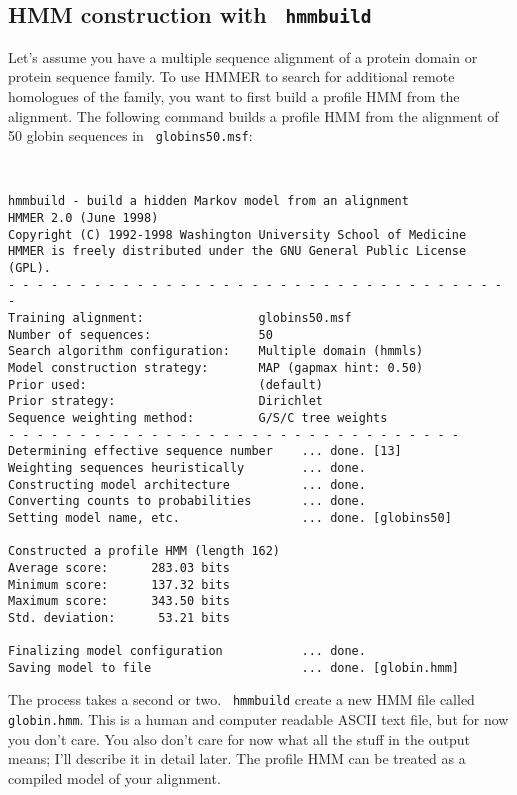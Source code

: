 \documentclass[11pt]{report}
\newcommand{\prog}[1]{\texttt{#1}}
\newcommand{\user}[1]{\noindent{\small\bfseries\texttt{$>$ #1}}\\}
\begin{document}
\subsection{HMM construction with \prog{ hmmbuild}}

Let's assume you have a multiple sequence alignment of a protein
domain or protein sequence family. To use HMMER to search for
additional remote homologues of the family, you want to first build a
profile HMM from the alignment. The following command builds a profile
HMM from the alignment of 50 globin sequences in \prog{ globins50.msf}:

\vspace{1.5em}
\user{hmmbuild globin.hmm globins50.msf}
\vspace{-1.5em}
{\small\begin{verbatim}
hmmbuild - build a hidden Markov model from an alignment
HMMER 2.0 (June 1998)
Copyright (C) 1992-1998 Washington University School of Medicine
HMMER is freely distributed under the GNU General Public License (GPL).
- - - - - - - - - - - - - - - - - - - - - - - - - - - - - - - - - - - -
Training alignment:                globins50.msf
Number of sequences:               50
Search algorithm configuration:    Multiple domain (hmmls)
Model construction strategy:       MAP (gapmax hint: 0.50)
Prior used:                        (default)
Prior strategy:                    Dirichlet
Sequence weighting method:         G/S/C tree weights
- - - - - - - - - - - - - - - - - - - - - - - - - - - - - - - -
Determining effective sequence number    ... done. [13]
Weighting sequences heuristically        ... done.
Constructing model architecture          ... done.
Converting counts to probabilities       ... done.
Setting model name, etc.                 ... done. [globins50]

Constructed a profile HMM (length 162)
Average score:      283.03 bits
Minimum score:      137.32 bits
Maximum score:      343.50 bits
Std. deviation:      53.21 bits

Finalizing model configuration           ... done.
Saving model to file                     ... done. [globin.hmm]
\end{verbatim}}

The process takes a second or two.  \prog{ hmmbuild} create a new HMM
file called \prog{ globin.hmm}. This is a human and computer readable
ASCII text file, but for now you don't care. You also don't care for
now what all the stuff in the output means; I'll describe it in detail
later. The profile HMM can be treated as a compiled model of your
alignment.
\end{document}
